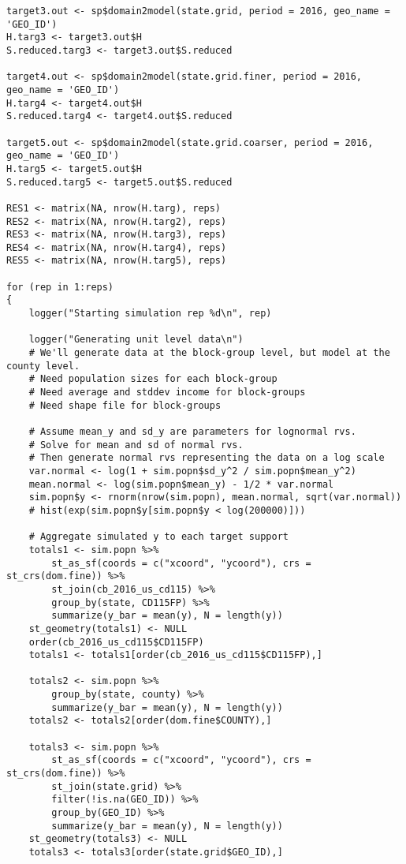 \documentclass[12pt]{article}
\begin{document}
\begin{scriptsize}
\begin{verbatim}
target3.out <- sp$domain2model(state.grid, period = 2016, geo_name = 'GEO_ID')
H.targ3 <- target3.out$H
S.reduced.targ3 <- target3.out$S.reduced

target4.out <- sp$domain2model(state.grid.finer, period = 2016, geo_name = 'GEO_ID')
H.targ4 <- target4.out$H
S.reduced.targ4 <- target4.out$S.reduced

target5.out <- sp$domain2model(state.grid.coarser, period = 2016, geo_name = 'GEO_ID')
H.targ5 <- target5.out$H
S.reduced.targ5 <- target5.out$S.reduced

RES1 <- matrix(NA, nrow(H.targ), reps)
RES2 <- matrix(NA, nrow(H.targ2), reps)
RES3 <- matrix(NA, nrow(H.targ3), reps)
RES4 <- matrix(NA, nrow(H.targ4), reps)
RES5 <- matrix(NA, nrow(H.targ5), reps)

for (rep in 1:reps)
{
    logger("Starting simulation rep %d\n", rep)

    logger("Generating unit level data\n")
    # We'll generate data at the block-group level, but model at the county level.
    # Need population sizes for each block-group
    # Need average and stddev income for block-groups
    # Need shape file for block-groups

    # Assume mean_y and sd_y are parameters for lognormal rvs.
    # Solve for mean and sd of normal rvs.
    # Then generate normal rvs representing the data on a log scale
    var.normal <- log(1 + sim.popn$sd_y^2 / sim.popn$mean_y^2)
    mean.normal <- log(sim.popn$mean_y) - 1/2 * var.normal
    sim.popn$y <- rnorm(nrow(sim.popn), mean.normal, sqrt(var.normal))
    # hist(exp(sim.popn$y[sim.popn$y < log(200000)]))

    # Aggregate simulated y to each target support
    totals1 <- sim.popn %>%
        st_as_sf(coords = c("xcoord", "ycoord"), crs = st_crs(dom.fine)) %>%
        st_join(cb_2016_us_cd115) %>%
        group_by(state, CD115FP) %>%
        summarize(y_bar = mean(y), N = length(y))
    st_geometry(totals1) <- NULL
    order(cb_2016_us_cd115$CD115FP)
    totals1 <- totals1[order(cb_2016_us_cd115$CD115FP),]

    totals2 <- sim.popn %>%
        group_by(state, county) %>%
        summarize(y_bar = mean(y), N = length(y))
    totals2 <- totals2[order(dom.fine$COUNTY),]

    totals3 <- sim.popn %>%
        st_as_sf(coords = c("xcoord", "ycoord"), crs = st_crs(dom.fine)) %>%
        st_join(state.grid) %>%
        filter(!is.na(GEO_ID)) %>%
        group_by(GEO_ID) %>%
        summarize(y_bar = mean(y), N = length(y))
    st_geometry(totals3) <- NULL
    totals3 <- totals3[order(state.grid$GEO_ID),]


\end{verbatim}
\end{scriptsize}
\end{document}
